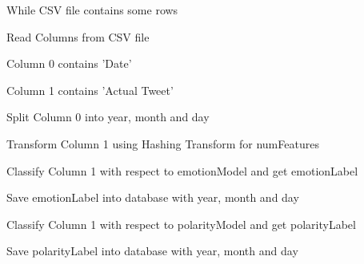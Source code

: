 \documentclass[oneside,a4paper,12pt]{pictreport}
\begin{document}
While CSV file contains some rows
	\par Read Columns from CSV file
	\par Column 0 contains 'Date'
	\par Column 1 contains 'Actual Tweet'
	\par Split Column 0 into year, month and day
	\par Transform Column 1 using Hashing Transform for numFeatures
	\par Classify Column 1 with respect to emotionModel and get emotionLabel
	\par Save emotionLabel into database with year, month and day
	\par Classify Column 1 with respect to polarityModel and get polarityLabel
	\par Save polarityLabel into database with year, month and day
\end{document}
